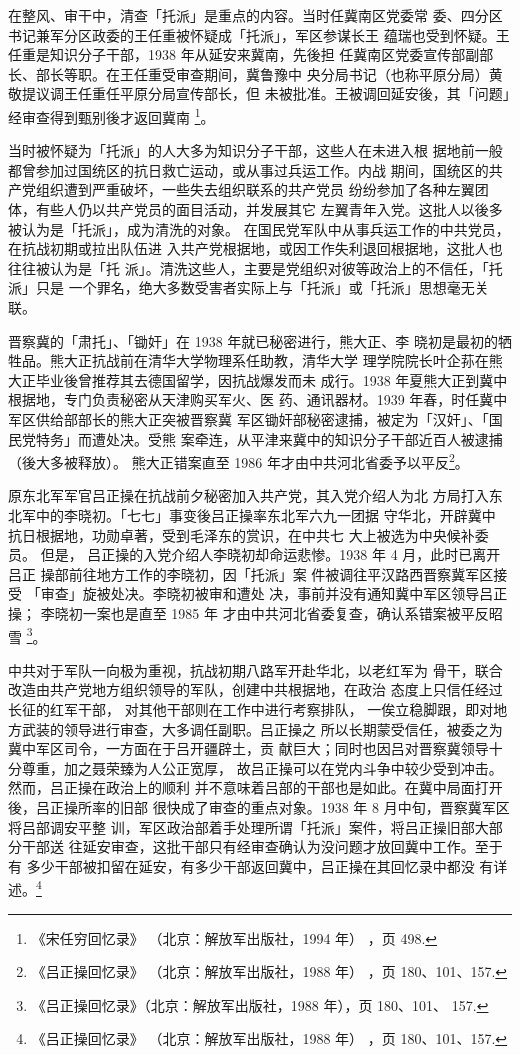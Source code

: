在整风、审干中，清查「托派」是重点的内容。当时任冀南区党委常
委、四分区书记兼军分区政委的王任重被怀疑成「托派」，军区参谋长王
蕴瑞也受到怀疑。王任重是知识分子干部，1938 年从延安来冀南，先後担
任冀南区党委宣传部副部长、部长等职。在王任重受审查期间，冀鲁豫中
央分局书记（也称平原分局）黄敬提议调王任重任平原分局宣传部长，但
未被批准。王被调回延安後，其「问题」经审查得到甄别後才返回冀南
\footnote{《宋任穷回忆录》
（北京：解放军出版社，1994 年）
，页 498.}。

当时被怀疑为「托派」的人大多为知识分子干部，这些人在未进入根
据地前一般都曾参加过国统区的抗日救亡运动，或从事过兵运工作。内战
期间，国统区的共产党组织遭到严重破坏，一些失去组织联系的共产党员
纷纷参加了各种左翼团体，有些人仍以共产党员的面目活动，并发展其它
左翼青年入党。这批人以後多被认为是「托派」，成为清洗的对象。
在国民党军队中从事兵运工作的中共党员，在抗战初期或拉出队伍进
入共产党根据地，或因工作失利退回根据地，这批人也往往被认为是「托
派」。清洗这些人，主要是党组织对彼等政治上的不信任，「托派」只是
一个罪名，绝大多数受害者实际上与「托派」或「托派」思想毫无关联。

晋察冀的「肃托」、「锄奸」在 1938 年就已秘密进行，熊大正、李
晓初是最初的牺牲品。熊大正抗战前在清华大学物理系任助教，清华大学
理学院院长叶企荪在熊大正毕业後曾推荐其去德国留学，因抗战爆发而未
成行。1938 年夏熊大正到冀中根据地，专门负责秘密从天津购买军火、医
药、通讯器材。1939 年春，时任冀中军区供给部部长的熊大正突被晋察冀
军区锄奸部秘密逮捕，被定为「汉奸」、「国民党特务」而遭处决。受熊
案牵连，从平津来冀中的知识分子干部近百人被逮捕（後大多被释放）。
熊大正错案直至 1986 年才由中共河北省委予以平反\footnote{《吕正操回忆录》
（北京：解放军出版社，1988 年）
，页 180、101、157.}。

原东北军军官吕正操在抗战前夕秘密加入共产党，其入党介绍人为北 方局打入东
北军中的李晓初。「七七」事变後吕正操率东北军六九一团据 守华北，开辟冀中
抗日根据地，功勋卓著，受到毛泽东的赏识，在中共七 大上被选为中央候补委员。
但是， 吕正操的入党介绍人李晓初却命运悲惨。1938 年 4 月，此时已离开吕正
操部前往地方工作的李晓初，因「托派」案 件被调往平汉路西晋察冀军区接受
「审查」旋被处决。李晓初被审和遭处 决，事前并没有通知冀中军区领导吕正操；
李晓初一案也是直至 1985 年 才由中共河北省委复查，确认系错案被平反昭雪
\footnote{《吕正操回忆录》（北京：解放军出版社，1988 年），页 180、101、
157.}。

中共对于军队一向极为重视，抗战初期八路军开赴华北，以老红军为
骨干，联合改造由共产党地方组织领导的军队，创建中共根据地，在政治
态度上只信任经过长征的红军干部，
对其他干部则在工作中进行考察排队，
一俟立稳脚跟，即对地方武装的领导进行审查，大多调任副职。吕正操之
所以长期蒙受信任，被委之为冀中军区司令，一方面在于吕开疆辟土，贡
献巨大；同时也因吕对晋察冀领导十分尊重，加之聂荣臻为人公正宽厚，
故吕正操可以在党内斗争中较少受到冲击。然而，吕正操在政治上的顺利
并不意味着吕部的干部也是如此。在冀中局面打开後，吕正操所率的旧部
很快成了审查的重点对象。1938 年 8 月中旬，晋察冀军区将吕部调安平整
训，军区政治部着手处理所谓「托派」案件，将吕正操旧部大部分干部送
往延安审查，这批干部只有经审查确认为没问题才放回冀中工作。至于有
多少干部被扣留在延安，有多少干部返回冀中，吕正操在其回忆录中都没
有详述。\footnote{《吕正操回忆录》
（北京：解放军出版社，1988 年）
，页 180、101、157.} 

